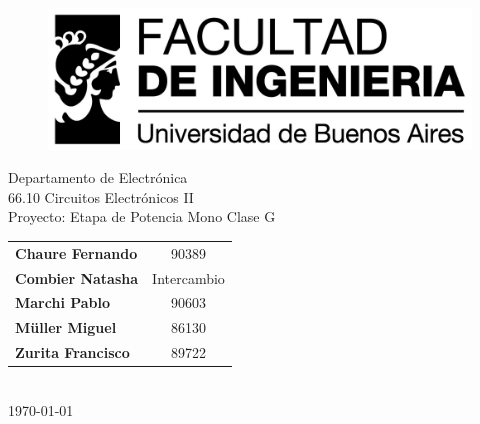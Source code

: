 %
%
\thispagestyle{empty}

\begin{figure}[t]
    \centering
    \includegraphics [scale=0.72]{img/logo_fiuba_alta.jpg}
\end{figure}

\vspace{5.5cm}

\begin{center}
    \Large{Departamento de Electrónica}\\
    \huge{66.10 Circuitos Electrónicos II}\\
    \vspace{.5cm}
    \large{Proyecto: Etapa de Potencia Mono Clase G}\\
    \vspace{1cm}
    \begin{tabular}{lc}
    \textbf{Chaure Fernando} & 90389 \\
    \textbf{Combier Natasha} & Intercambio \\    
    \textbf{Marchi Pablo} & 90603 \\
    \textbf{Müller Miguel} & 86130 \\
    \textbf{Zurita Francisco} & 89722 \\ 
    \end{tabular}\\
    \vspace{.3cm}
    \small{\today}\\
\end{center}

\vspace{1.5cm}

